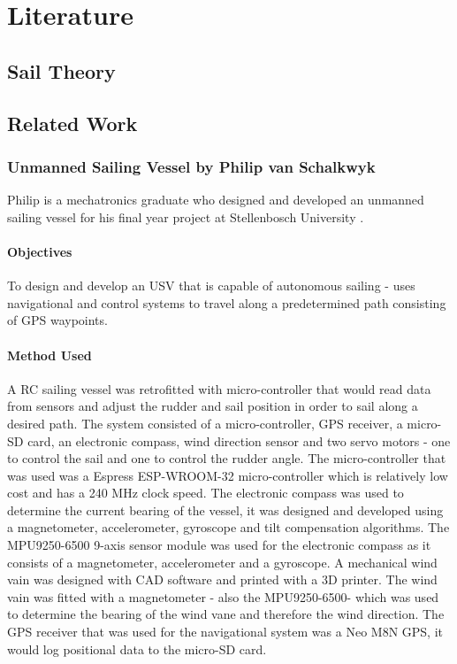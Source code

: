 \graphicspath{{literature/fig/}}

\chapter{Literature}

\section{Sail Theory}

\section{Related Work}
\subsection{Unmanned Sailing Vessel by Philip van Schalkwyk}
Philip is a mechatronics graduate who designed and developed an unmanned sailing vessel for his final year project at Stellenbosch University \cite{Phillip}.

\subsubsection{Objectives}
To design and develop an USV that is capable of autonomous sailing - uses navigational and control systems to travel along a predetermined path 
consisting of GPS waypoints. 

\subsubsection{Method Used}
A RC sailing vessel was retrofitted with micro-controller that would read data from sensors and adjust the rudder and sail position in order to sail along a 
desired path. The system consisted of a micro-controller, GPS receiver, a micro-SD card, an electronic compass, wind direction sensor and two servo motors - one to control the 
sail and one to control the rudder angle. The micro-controller that was used was a Espress ESP-WROOM-32 micro-controller which is relatively low cost and has 
a 240 MHz clock speed. The electronic compass was used to determine the current bearing of the vessel, it was designed and developed using a magnetometer, 
accelerometer, gyroscope and tilt compensation algorithms. The MPU9250-6500 9-axis sensor module was used for the electronic compass as it consists of a magnetometer, accelerometer and a 
gyroscope. A mechanical wind vain was designed with CAD software and printed with a 3D printer. The wind vain
was fitted with a magnetometer - also the MPU9250-6500- which was used to determine the bearing of the wind vane and therefore the wind direction. The GPS receiver that was used for the navigational
system was a Neo M8N GPS, it would log positional data to the micro-SD card. 

